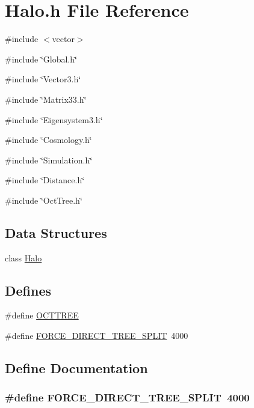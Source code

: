 \section{Halo.h File Reference}
\label{Halo_8h}
{\ttfamily \#include $<$vector$>$}\par
{\ttfamily \#include \char`\"{}Global.h\char`\"{}}\par
{\ttfamily \#include \char`\"{}Vector3.h\char`\"{}}\par
{\ttfamily \#include \char`\"{}Matrix33.h\char`\"{}}\par
{\ttfamily \#include \char`\"{}Eigensystem3.h\char`\"{}}\par
{\ttfamily \#include \char`\"{}Cosmology.h\char`\"{}}\par
{\ttfamily \#include \char`\"{}Simulation.h\char`\"{}}\par
{\ttfamily \#include \char`\"{}Distance.h\char`\"{}}\par
{\ttfamily \#include \char`\"{}OctTree.h\char`\"{}}\par
\subsection*{Data Structures}
\begin{DoxyCompactItemize}
\item 
class \hyperlink{classHalo}{Halo}
\end{DoxyCompactItemize}
\subsection*{Defines}
\begin{DoxyCompactItemize}
\item 
\#define \hyperlink{Halo_8h_a690ba77d26036cf5527579144de3086b}{OCTTREE}
\item 
\#define \hyperlink{Halo_8h_aeba9909ecec48c05016e48aec42a9469}{FORCE\_\-DIRECT\_\-TREE\_\-SPLIT}~4000
\end{DoxyCompactItemize}


\subsection{Define Documentation}
\subsubsection[{FORCE\_\-DIRECT\_\-TREE\_\-SPLIT}]{\setlength{\rightskip}{0pt plus 5cm}\#define FORCE\_\-DIRECT\_\-TREE\_\-SPLIT~4000}\label{Halo_8h_aeba9909ecec48c05016e48aec42a9469}


